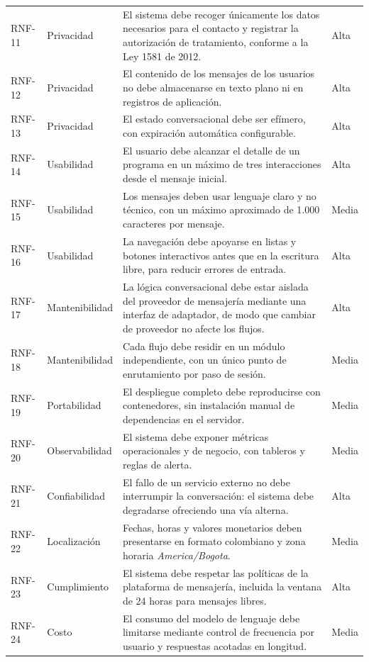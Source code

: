 \documentclass[12pt,a4paper]{report}
\begin{document}
{\begin{longtable}{p{1.6cm}p{3.1cm}p{7.4cm}p{1.4cm}}
RNF-11 & Privacidad & El sistema debe recoger únicamente los datos necesarios para el contacto y registrar la autorización de tratamiento, conforme a la Ley 1581 de 2012. & Alta \\
RNF-12 & Privacidad & El contenido de los mensajes de los usuarios no debe almacenarse en texto plano ni en registros de aplicación. & Alta \\
RNF-13 & Privacidad & El estado conversacional debe ser efímero, con expiración automática configurable. & Alta \\
RNF-14 & Usabilidad & El usuario debe alcanzar el detalle de un programa en un máximo de tres interacciones desde el mensaje inicial. & Alta \\
RNF-15 & Usabilidad & Los mensajes deben usar lenguaje claro y no técnico, con un máximo aproximado de 1.000 caracteres por mensaje. & Media \\
RNF-16 & Usabilidad & La navegación debe apoyarse en listas y botones interactivos antes que en la escritura libre, para reducir errores de entrada. & Alta \\
RNF-17 & Mantenibilidad & La lógica conversacional debe estar aislada del proveedor de mensajería mediante una interfaz de adaptador, de modo que cambiar de proveedor no afecte los flujos. & Alta \\
RNF-18 & Mantenibilidad & Cada flujo debe residir en un módulo independiente, con un único punto de enrutamiento por paso de sesión. & Media \\
RNF-19 & Portabilidad & El despliegue completo debe reproducirse con contenedores, sin instalación manual de dependencias en el servidor. & Media \\
RNF-20 & Observabilidad & El sistema debe exponer métricas operacionales y de negocio, con tableros y reglas de alerta. & Media \\
RNF-21 & Confiabilidad & El fallo de un servicio externo no debe interrumpir la conversación: el sistema debe degradarse ofreciendo una vía alterna. & Alta \\
RNF-22 & Localización & Fechas, horas y valores monetarios deben presentarse en formato colombiano y zona horaria \textit{America/Bogota}. & Media \\
RNF-23 & Cumplimiento & El sistema debe respetar las políticas de la plataforma de mensajería, incluida la ventana de 24 horas para mensajes libres. & Alta \\
RNF-24 & Costo & El consumo del modelo de lenguaje debe limitarse mediante control de frecuencia por usuario y respuestas acotadas en longitud. & Media \\
\end{longtable}}
\end{document}
